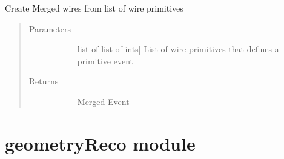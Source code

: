 \documentclass[letterpaper,10pt,english]{sphinxmanual}
\begin{document}
\begin{fulllineitems}
\label{\detokenize{geometryGen:geometryGen.mergeEvent}}
Create Merged wires from list of wire primitives
\begin{quote}\begin{description}
\item[{Parameters}] \leavevmode\begin{description}
\item[{}] \leavevmode{[}list of list of ints{]}
List of wire primitives that defines a primitive event

\end{description}

\item[{Returns}] \leavevmode\begin{description}
\item[{}] \leavevmode
Merged Event

\end{description}

\end{description}\end{quote}

\end{fulllineitems}



\section{geometryReco module}
\label{\detokenize{geometryReco:module-geometryReco}}\label{\detokenize{geometryReco:geometryreco-module}}\label{\detokenize{geometryReco::doc}}
\end{document}
